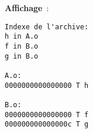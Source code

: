 \begin{frame}[fragile]
\begin{center}
\begin{minipage}[c]{.4\textwidth}
{\bf Affichage}~: \\
\begin{small}
\end{small}
\end{minipage}
\qquad
\begin{minipage}[c]{.2\textwidth}
\begin{lstlisting}[frame=single,numbers=none,basicstyle=\ttfamily\tiny,
showstringspaces=false]
Indexe de l'archive:
h in A.o
f in B.o
g in B.o

A.o:
0000000000000000 T h

B.o:
0000000000000000 T f
000000000000000c T g
\end{lstlisting}
\end{minipage}
\end{center}
\end{frame}
